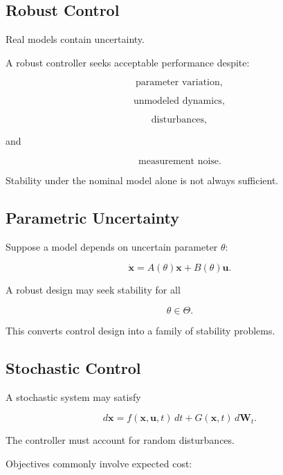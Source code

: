 \subsection{Robust Control}
\label{subsec:robust-control}

Real models contain uncertainty.

A robust controller seeks acceptable performance despite:

\[
\boxed{
\text{parameter variation},
}
\]

\[
\boxed{
\text{unmodeled dynamics},
}
\]

\[
\boxed{
\text{disturbances},
}
\]

and

\[
\boxed{
\text{measurement noise}.
}
\]

Stability under the nominal model alone is not always sufficient.

\subsection{Parametric Uncertainty}
\label{subsec:parametric-uncertainty-control}

Suppose a model depends on uncertain parameter \(\theta\):

\[
\boxed{
\dot{\mathbf{x}}
=
A(\theta)\mathbf{x}
+
B(\theta)\mathbf{u}.
}
\]

A robust design may seek stability for all

\[
\boxed{
\theta
\in
\Theta.
}
\]

This converts control design into a family of stability problems.

\subsection{Stochastic Control}
\label{subsec:stochastic-control}

A stochastic system may satisfy

\[
\boxed{
d\mathbf{x}
=
f(\mathbf{x},\mathbf{u},t)\,dt
+
G(\mathbf{x},t)\,d\mathbf{W}_t.
}
\]

The controller must account for random disturbances.

Objectives commonly involve expected cost:

